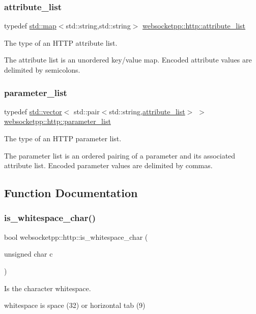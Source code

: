 \subsubsection{\texorpdfstring{attribute\+\_\+list}{attribute\_list}}
{\footnotesize\ttfamily typedef \mbox{\hyperlink{classstd_1_1map}{std\+::map}}$<$std\+::string,std\+::string$>$ \mbox{\hyperlink{namespacewebsocketpp_1_1http_a9744f4104772b987aa9e86c35ce1357b}{websocketpp\+::http\+::attribute\+\_\+list}}}



The type of an H\+T\+TP attribute list. 

The attribute list is an unordered key/value map. Encoded attribute values are delimited by semicolons. \mbox{\label{namespacewebsocketpp_1_1http_a2c285bc959df5a63bf962bed842fccfb}} 
\subsubsection{\texorpdfstring{parameter\+\_\+list}{parameter\_list}}
{\footnotesize\ttfamily typedef \mbox{\hyperlink{classstd_1_1vector}{std\+::vector}}$<$ std\+::pair$<$std\+::string,\mbox{\hyperlink{namespacewebsocketpp_1_1http_a9744f4104772b987aa9e86c35ce1357b}{attribute\+\_\+list}}$>$ $>$ \mbox{\hyperlink{namespacewebsocketpp_1_1http_a2c285bc959df5a63bf962bed842fccfb}{websocketpp\+::http\+::parameter\+\_\+list}}}



The type of an H\+T\+TP parameter list. 

The parameter list is an ordered pairing of a parameter and its associated attribute list. Encoded parameter values are delimited by commas. 

\subsection{Function Documentation}
\mbox{\label{namespacewebsocketpp_1_1http_a8ff7039dd19159bdbce3b98159c66ae2}} 
\subsubsection{\texorpdfstring{is\+\_\+whitespace\+\_\+char()}{is\_whitespace\_char()}}
{\footnotesize\ttfamily bool websocketpp\+::http\+::is\+\_\+whitespace\+\_\+char (\begin{DoxyParamCaption}\item[{unsigned char}]{c }\end{DoxyParamCaption})\hspace{0.3cm}{\ttfamily [inline]}}



Is the character whitespace. 

whitespace is space (32) or horizontal tab (9) 